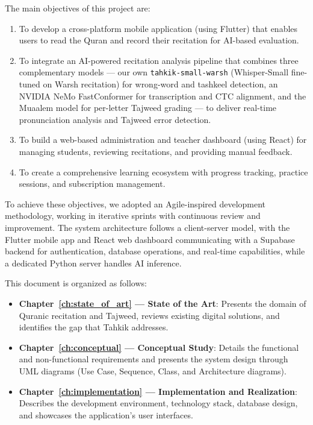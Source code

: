 The main objectives of this project are:
\begin{enumerate}
  \item To develop a cross-platform mobile application (using Flutter) that enables users to read the Quran and record their recitation for AI-based evaluation.
  \item To integrate an AI-powered recitation analysis pipeline that combines three complementary models --- our own \texttt{tahkik-small-warsh} (Whisper-Small fine-tuned on Warsh recitation) for wrong-word and tashkeel detection, an NVIDIA NeMo FastConformer for transcription and CTC alignment, and the Muaalem model for per-letter Tajweed grading --- to deliver real-time pronunciation analysis and Tajweed error detection.
  \item To build a web-based administration and teacher dashboard (using React) for managing students, reviewing recitations, and providing manual feedback.
  \item To create a comprehensive learning ecosystem with progress tracking, practice sessions, and subscription management.
\end{enumerate}

To achieve these objectives, we adopted an Agile-inspired development methodology, working in iterative sprints with continuous review and improvement. The system architecture follows a client-server model, with the Flutter mobile app and React web dashboard communicating with a Supabase backend for authentication, database operations, and real-time capabilities, while a dedicated Python server handles AI inference.

This document is organized as follows:

\begin{itemize}
  \item \textbf{Chapter~\ref{ch:state_of_art} --- State of the Art}: Presents the domain of Quranic recitation and Tajweed, reviews existing digital solutions, and identifies the gap that Tahkik addresses.
  \item \textbf{Chapter~\ref{ch:conceptual} --- Conceptual Study}: Details the functional and non-functional requirements and presents the system design through UML diagrams (Use Case, Sequence, Class, and Architecture diagrams).
  \item \textbf{Chapter~\ref{ch:implementation} --- Implementation and Realization}: Describes the development environment, technology stack, database design, and showcases the application's user interfaces.
\end{itemize}

